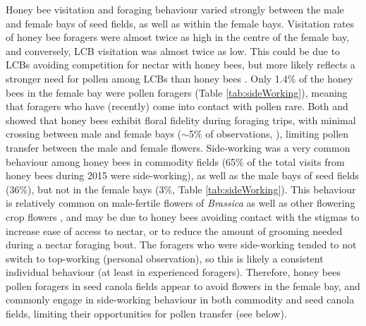 \documentclass[12pt]{article} %
\begin{document}
Honey bee visitation and foraging behaviour varied strongly between the male and female bays of seed fields, as well as within the female bays.
Visitation rates of honey bee foragers were almost twice as high in the centre of the female bay, and conversely, LCB visitation was almost twice as low.
This could be due to LCBs avoiding competition for nectar with honey bees, but more likely reflects a stronger need for pollen among LCBs than honey bees \citep{cane2011}.
Only 1.4\% of the honey bees in the female bay were pollen foragers (Table \ref{tab:sideWorking}), meaning that foragers who have (recently) come into contact with pollen rare.
Both \citet{waytesMsc} and \citet{gaffney2019} showed that honey bees exhibit floral fidelity during foraging trips, with minimal crossing between male and female bays ($\sim$5\% of observations, \citealp{waytesMsc}), limiting pollen transfer between the male and female flowers.
Side-working was a very common behaviour among honey bees in commodity fields (65\% of the total visits from honey bees during 2015 were side-working), as well as the male bays of seed fields (36\%), but not in the female bays (3\%, Table \ref{tab:sideWorking}).
This behaviour is relatively common on male-fertile flowers of \textit{Brassica} \citep{free1973,free1983,delbrassine1988,mohr1988} as well as other flowering crop flowers \citep{thomson2001}, and may be due to honey bees avoiding contact with the stigmas to increase ease of access to nectar, or to reduce the amount of grooming needed during a nectar foraging bout.
The foragers who were side-working tended to not switch to top-working (personal observation), so this is likely a consistent individual behaviour (at least in experienced foragers).
Therefore, honey bees pollen foragers in seed canola fields appear to avoid flowers in the female bay, and commonly engage in side-working behaviour in both commodity and seed canola fields, limiting their opportunities for pollen transfer (see below).
\end{document}
